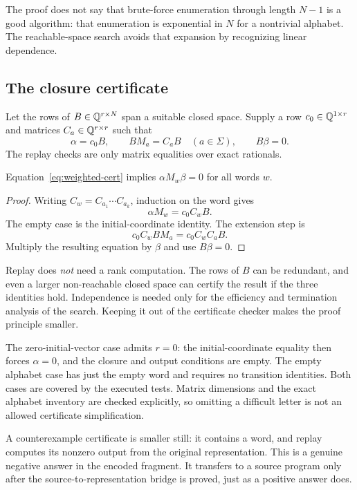 The proof does not say that brute-force enumeration through length $N-1$ is a
good algorithm: that enumeration is exponential in $N$ for a nontrivial
alphabet. The reachable-space search avoids that expansion by recognizing
linear dependence.

\subsection{The closure certificate}

Let the rows of $B\in\mathbb{Q}^{r\times N}$ span a suitable closed space. Supply a row
$c_0\in\mathbb{Q}^{1\times r}$ and matrices $C_a\in\mathbb{Q}^{r\times r}$ such that
\begin{equation}
 \alpha=c_0B,\qquad BM_a=C_aB\quad(a\in\Sigma),\qquad B\beta=0.
 \label{eq:weighted-cert}
\end{equation}
The replay checks are only matrix equalities over exact rationals.

\begin{theorem}
Equation~\eqref{eq:weighted-cert} implies $\alpha M_w\beta=0$ for all words $w$.
\end{theorem}
\begin{proof}
Writing $C_w=C_{a_1}\cdots C_{a_k}$, induction on the word gives
\[
 \alpha M_w=c_0C_wB.
\]
The empty case is the initial-coordinate identity. The extension step is
\[
 c_0C_wBM_a=c_0C_wC_aB.
\]
Multiply the resulting equation by $\beta$ and use $B\beta=0$.
\end{proof}

Replay does \emph{not} need a rank computation. The rows of $B$ can be redundant,
and even a larger non-reachable closed space can certify the result if the
three identities hold. Independence is needed only for the efficiency and
termination analysis of the search. Keeping it out of the certificate checker
makes the proof principle smaller.

The zero-initial-vector case admits $r=0$: the initial-coordinate equality then
forces $\alpha=0$, and the closure and output conditions are empty. The empty
alphabet case has just the empty word and requires no transition identities.
Both cases are covered by the executed tests. Matrix dimensions and the exact
alphabet inventory are checked explicitly, so omitting a difficult letter is
not an allowed certificate simplification.

A counterexample certificate is smaller still: it contains a word, and replay
computes its nonzero output from the original representation. This is a genuine
negative answer in the encoded fragment. It transfers to a source program only
after the source-to-representation bridge is proved, just as a positive answer
does.

